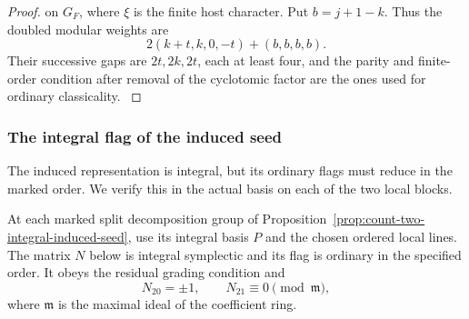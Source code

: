 \begin{proof}
on \(G_F\), where \(\xi\) is the finite host character. Put
\(b=j+1-k\). Thus the doubled modular weights are
\[
         2(k+t,k,0,-t)+(b,b,b,b).
\]
Their successive gaps are \(2t,2k,2t\), each at least four, and the parity and finite-order
condition after removal of the cyclotomic factor are
the ones used for ordinary classicality.
\hfill\mbox{\cite{arthur-clozel,clozel-rajan}}\label{cor:ordinary-promodularity-9}

\end{proof}

\subsubsection{The integral flag of the induced seed}
\label{par:induced-flag}

The induced representation is integral, but its ordinary flags must reduce in the marked order. We verify this in the actual basis on each of the two local blocks.

\begin{lemma}\label{lem:count-two-local-induced-flags}
At each marked split decomposition group of
Proposition~\ref{prop:count-two-integral-induced-seed}, use its
integral basis \(P\) and the chosen ordered local lines. The
matrix \(N\) below is integral symplectic and its flag is
ordinary in the specified order. It obeys the residual grading condition and 
\[
 N_{20}=\pm1,\qquad N_{21}\equiv0\pmod{\mathfrak m},
\]
 where \(\mathfrak m\) is the maximal ideal of the coefficient ring.
\end{lemma}

